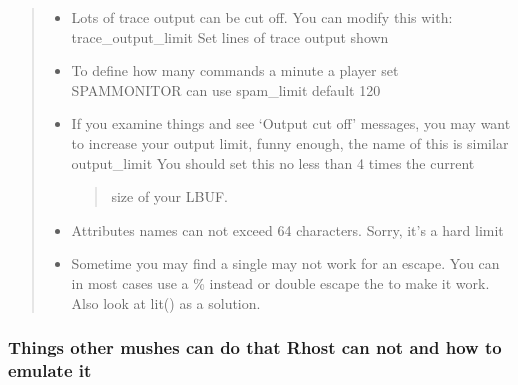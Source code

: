 \documentclass[letterpaper,10pt,english]{sphinxmanual}
\begin{document}
\begin{quote}
\begin{itemize}
\item {} 
\sphinxAtStartPar
Lots of trace output can be cut off.  You can modify this with:
\sphinxhyphen{} trace\_output\_limit   \sphinxhyphen{} Set lines of trace output shown

\item {} 
\sphinxAtStartPar
To define how many commands a minute a player set SPAMMONITOR can use
\sphinxhyphen{} spam\_limit \textendash{} default 120

\item {} 
\sphinxAtStartPar
If you examine things and see ‘Output cut off’ messages, you may want
to increase your output limit, funny enough, the name of this is
similar
\sphinxhyphen{} output\_limit \sphinxhyphen{} You should set this no less than 4 times the current
\begin{quote}

\sphinxAtStartPar
size of your LBUF.
\end{quote}

\item {} 
\sphinxAtStartPar
Attributes names can not exceed 64 characters.  Sorry, it’s a hard limit

\item {} 
\sphinxAtStartPar
Sometime you may find a single may not work for an escape.  You can
in most cases use a \% instead or double escape the to make it work.
Also look at lit() as a solution.

\end{itemize}
\end{quote}


\subsubsection{Things other mushes can do that Rhost can not and how to emulate it}
\label{\detokenize{features:things-other-mushes-can-do-that-rhost-can-not-and-how-to-emulate-it}}
\end{document}
